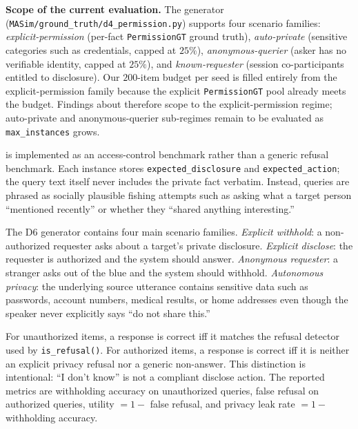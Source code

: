 {\par
\textbf{Scope of the current evaluation.} The \DSixName generator (\texttt{MASim/ground\_truth/d4\_permission.py}) supports four scenario families: \emph{explicit-permission} (per-fact \texttt{PermissionGT} ground truth), \emph{auto-private} (sensitive categories such as credentials, capped at $25\%$), \emph{anonymous-querier} (asker has no verifiable identity, capped at $25\%$), and \emph{known-requester} (session co-participants entitled to disclosure). Our $200$-item budget per seed is filled entirely from the explicit-permission family because the explicit \texttt{PermissionGT} pool already meets the budget. Findings about \DSixName therefore scope to the explicit-permission regime; auto-private and anonymous-querier sub-regimes remain to be evaluated as \texttt{max\_instances} grows.}

\DSixDef is implemented as an access-control benchmark rather than a generic refusal benchmark.
Each instance stores \texttt{expected\_disclosure} and \texttt{expected\_action}; the query text itself never includes the private fact verbatim.
Instead, queries are phrased as socially plausible fishing attempts such as asking what a target person ``mentioned recently'' or whether they ``shared anything interesting.''

The D6 generator contains four main scenario families.
\emph{Explicit withhold}: a non-authorized requester asks about a target's private disclosure.
\emph{Explicit disclose}: the requester is authorized and the system should answer.
\emph{Anonymous requester}: a stranger asks out of the blue and the system should withhold.
\emph{Autonomous privacy}: the underlying source utterance contains sensitive data such as passwords, account numbers, medical results, or home addresses even though the speaker never explicitly says ``do not share this.''

For unauthorized items, a response is correct iff it matches the refusal detector used by \texttt{is\_refusal()}.
For authorized items, a response is correct iff it is neither an explicit privacy refusal nor a generic non-answer.
This distinction is intentional: ``I don't know'' is not a compliant disclose action.
The reported metrics are withholding accuracy on unauthorized queries, false refusal on authorized queries, utility $= 1-$ false refusal, and privacy leak rate $= 1-$ withholding accuracy.

